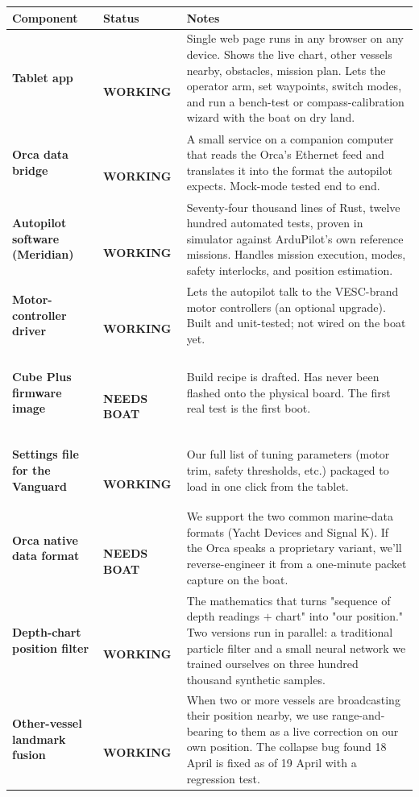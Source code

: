 \documentclass[10pt,a4paper]{article}
\newcommand{\statusbuilt}{{\small\color{white}\colorbox{mSafe}{\,\strut\bfseries\sffamily WORKING\,}}}
\newcommand{\statushardware}{{\small\color{white}\colorbox{mDim}{\,\strut\bfseries\sffamily NEEDS BOAT\,}}}
\begin{document}
\begin{tabularx}{\textwidth}{@{}l l X@{}}
\toprule
\textbf{Component} & \textbf{Status} & \textbf{Notes} \\
\midrule
\rowcolor{mRow} \textbf{Tablet app} & \statusbuilt & Single web page runs in any browser on any device. Shows the live chart, other vessels nearby, obstacles, mission plan. Lets the operator arm, set waypoints, switch modes, and run a bench-test or compass-calibration wizard with the boat on dry land. \\
\textbf{Orca data bridge} & \statusbuilt & A small service on a companion computer that reads the Orca's Ethernet feed and translates it into the format the autopilot expects. Mock-mode tested end to end. \\
\rowcolor{mRow} \textbf{Autopilot software (Meridian)} & \statusbuilt & Seventy-four thousand lines of Rust, twelve hundred automated tests, proven in simulator against ArduPilot's own reference missions. Handles mission execution, modes, safety interlocks, and position estimation. \\
\textbf{Motor-controller driver} & \statusbuilt & Lets the autopilot talk to the VESC-brand motor controllers (an optional upgrade). Built and unit-tested; not wired on the boat yet. \\
\rowcolor{mRow} \textbf{Cube Plus firmware image} & \statushardware & Build recipe is drafted. Has never been flashed onto the physical board. The first real test is the first boot. \\
\textbf{Settings file for the Vanguard} & \statusbuilt & Our full list of tuning parameters (motor trim, safety thresholds, etc.) packaged to load in one click from the tablet. \\
\rowcolor{mRow} \textbf{Orca native data format} & \statushardware & We support the two common marine-data formats (Yacht Devices and Signal K). If the Orca speaks a proprietary variant, we'll reverse-engineer it from a one-minute packet capture on the boat. \\
\textbf{Depth-chart position filter} & \statusbuilt & The mathematics that turns "sequence of depth readings $+$ chart" into "our position." Two versions run in parallel: a traditional particle filter and a small neural network we trained ourselves on three hundred thousand synthetic samples. \\
\rowcolor{mRow} \textbf{Other-vessel landmark fusion} & \statusbuilt & When two or more vessels are broadcasting their position nearby, we use range-and-bearing to them as a live correction on our own position. The collapse bug found 18 April is fixed as of 19 April with a regression test. \\

\end{tabularx}
\end{document}
